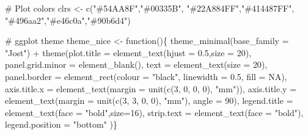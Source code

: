 \documentclass[
  letterpaper,
  DIV=11,
  numbers=noendperiod]{scrartcl}
\newenvironment{Shaded}{\begin{snugshade}}{\end{snugshade}}
\newcommand{\AttributeTok}[1]{\textcolor[rgb]{0.40,0.45,0.13}{#1}}
\newcommand{\CommentTok}[1]{\textcolor[rgb]{0.37,0.37,0.37}{#1}}
\newcommand{\ConstantTok}[1]{\textcolor[rgb]{0.56,0.35,0.01}{#1}}
\newcommand{\ControlFlowTok}[1]{\textcolor[rgb]{0.00,0.23,0.31}{#1}}
\newcommand{\DecValTok}[1]{\textcolor[rgb]{0.68,0.00,0.00}{#1}}
\newcommand{\FloatTok}[1]{\textcolor[rgb]{0.68,0.00,0.00}{#1}}
\newcommand{\FunctionTok}[1]{\textcolor[rgb]{0.28,0.35,0.67}{#1}}
\newcommand{\NormalTok}[1]{\textcolor[rgb]{0.00,0.23,0.31}{#1}}
\newcommand{\OtherTok}[1]{\textcolor[rgb]{0.00,0.23,0.31}{#1}}
\newcommand{\SpecialCharTok}[1]{\textcolor[rgb]{0.37,0.37,0.37}{#1}}
\newcommand{\StringTok}[1]{\textcolor[rgb]{0.13,0.47,0.30}{#1}}
\begin{document}
\begin{Shaded}
\begin{Highlighting}[]
\CommentTok{\# Plot colors}
\NormalTok{clrs }\OtherTok{\textless{}{-}} \FunctionTok{c}\NormalTok{(}\StringTok{"\#54AA8F"}\NormalTok{,}\StringTok{"\#00335B"}\NormalTok{,}
          \StringTok{"\#22A884FF"}\NormalTok{,}\StringTok{"\#414487FF"}\NormalTok{,}
          \StringTok{"\#496aa2"}\NormalTok{,}\StringTok{"\#e46c0a"}\NormalTok{,}\StringTok{"\#90b6d4"}\NormalTok{)}


\CommentTok{\# ggplot theme}
\NormalTok{theme\_nice }\OtherTok{\textless{}{-}} \ControlFlowTok{function}\NormalTok{()\{}
  \FunctionTok{theme\_minimal}\NormalTok{(}\AttributeTok{base\_family =} \StringTok{"Jost"}\NormalTok{) }\SpecialCharTok{+}  
    \FunctionTok{theme}\NormalTok{(}\AttributeTok{plot.title       =} \FunctionTok{element\_text}\NormalTok{(}\AttributeTok{hjust =} \FloatTok{0.5}\NormalTok{,}\AttributeTok{size =} \DecValTok{20}\NormalTok{),}
          \AttributeTok{panel.grid.minor =} \FunctionTok{element\_blank}\NormalTok{(),}
          \AttributeTok{text             =} \FunctionTok{element\_text}\NormalTok{(}\AttributeTok{size  =} \DecValTok{20}\NormalTok{),}
          \AttributeTok{panel.border     =} \FunctionTok{element\_rect}\NormalTok{(}\AttributeTok{colour =} \StringTok{"black"}\NormalTok{, }\AttributeTok{linewidth =} \FloatTok{0.5}\NormalTok{, }\AttributeTok{fill =} \ConstantTok{NA}\NormalTok{),}
          \AttributeTok{axis.title.x     =} \FunctionTok{element\_text}\NormalTok{(}\AttributeTok{margin =} \FunctionTok{unit}\NormalTok{(}\FunctionTok{c}\NormalTok{(}\DecValTok{3}\NormalTok{, }\DecValTok{0}\NormalTok{, }\DecValTok{0}\NormalTok{, }\DecValTok{0}\NormalTok{), }\StringTok{"mm"}\NormalTok{)),}
          \AttributeTok{axis.title.y     =} \FunctionTok{element\_text}\NormalTok{(}\AttributeTok{margin =} \FunctionTok{unit}\NormalTok{(}\FunctionTok{c}\NormalTok{(}\DecValTok{3}\NormalTok{, }\DecValTok{3}\NormalTok{, }\DecValTok{0}\NormalTok{, }\DecValTok{0}\NormalTok{), }\StringTok{"mm"}\NormalTok{), }\AttributeTok{angle =} \DecValTok{90}\NormalTok{),}
          \AttributeTok{legend.title     =} \FunctionTok{element\_text}\NormalTok{(}\AttributeTok{face =} \StringTok{"bold"}\NormalTok{,}\AttributeTok{size=}\DecValTok{16}\NormalTok{),}
          \AttributeTok{strip.text       =} \FunctionTok{element\_text}\NormalTok{(}\AttributeTok{face =} \StringTok{"bold"}\NormalTok{),}
          \AttributeTok{legend.position  =} \StringTok{"bottom"}
\NormalTok{    )\}}
\end{Highlighting}
\end{Shaded}
\end{document}
